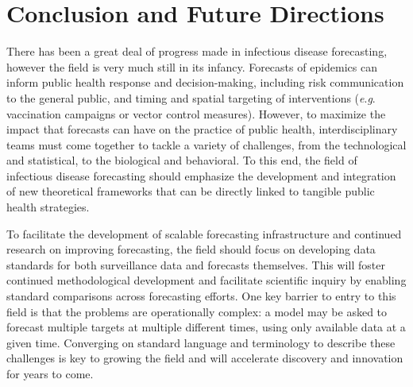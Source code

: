 \documentclass[a4paper]{article}
\newcommand{\eg}{\textit{e}.\textit{g}. }
\begin{document}


\section{Conclusion and Future Directions}

There has been a great deal of progress made in infectious disease forecasting, however the field is very much still in its infancy. 
Forecasts of epidemics can inform public health response and decision-making, including risk communication to the general public, and timing and spatial targeting of interventions (\eg vaccination campaigns or vector control measures).
However, to maximize the impact that forecasts can have on the practice of public health, interdisciplinary teams must come together to tackle a variety of challenges, from the technological and statistical, to the biological and behavioral.
To this end, the field of infectious disease forecasting should emphasize the development and integration of new theoretical frameworks that can be directly linked to tangible public health strategies.

To facilitate the development of scalable forecasting infrastructure and continued research on improving forecasting, the field should focus on developing data standards for both surveillance data and forecasts themselves. 
This will foster continued methodological development and facilitate scientific inquiry by enabling standard comparisons across forecasting efforts. 
One key barrier to entry to this field is that the problems are operationally complex: a model may be asked to forecast multiple targets at multiple different times, using only available data at a given time.
Converging on standard language and terminology to describe these challenges is key to growing the field and will accelerate discovery and innovation for years to come.
\end{document}
